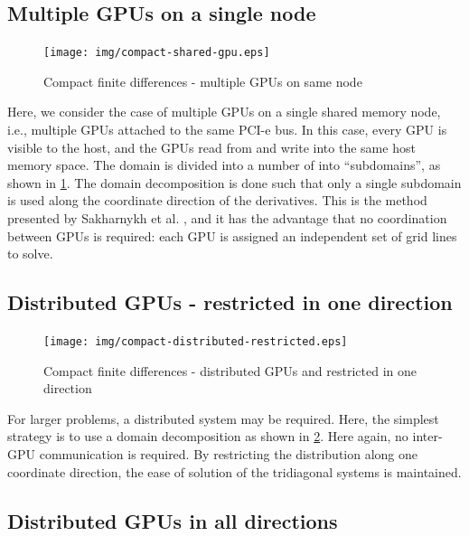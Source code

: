 \subsection{Multiple GPUs on a single node}

\begin{figure}
\begin{center}
\texttt{[image: img/compact-shared-gpu.eps]}
\caption{Compact finite differences - multiple GPUs
    on same node}
\label{fig:compact-shared-gpu}
\end{center}
\end{figure}

Here, we consider the case of multiple GPUs
on a single shared memory node, i.e.,
multiple GPUs attached to the same PCI-e bus.
In this case, every GPU is visible to the host,
and the GPUs read from and write into
the same host memory space.
The domain is divided into a number of
into ``subdomains'',
as shown in \ref{fig:compact-shared-gpu}.
The domain decomposition is done such that
only a single subdomain is used along the
coordinate direction of the derivatives.
This is the method presented by
Sakharnykh et al. \cite{sakharnykhADIconf},
and it has the advantage that
no coordination between GPUs is required:
each GPU is assigned an independent
set of grid lines to solve.

\subsection{Distributed GPUs - restricted in one direction}

\begin{figure}
\begin{center}
\texttt{[image: img/compact-distributed-restricted.eps]}
\caption{Compact finite differences - distributed GPUs and
    restricted in one direction}
\label{fig:compact-distributed-restricted}
\end{center}
\end{figure}

For larger problems,
a distributed system may be required.
Here, the simplest strategy is to use a domain decomposition
as shown in \ref{fig:compact-distributed-restricted}.
Here again, 
no inter-GPU communication is required.
By restricting the distribution along one coordinate direction,
the ease of solution of the tridiagonal systems is maintained.

\subsection{Distributed GPUs in all directions}

